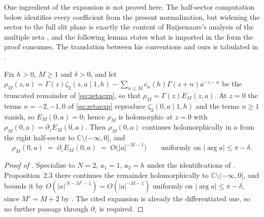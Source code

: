 \documentclass[11pt,letterpaper]{article}
\newcommand{\Zt}{\zeta_2}
\newcommand{\Cc}{\mathbb{C}}
\begin{document}
One ingredient of the expansion is not proved here. The half-sector computation
below identifies every coefficient from the present normalization, but widening
the sector to the full slit plane is exactly the content of Ruijsenaars's
analysis of the multiple zeta \cite{Ruij}, and the following lemma states what is
imported in the form the proof consumes. The translation between his conventions
and ours is tabulated in .

\begin{lemma}
\label{lem:sector}
Fix $h>0$, $M\ge1$ and $\delta>0$, and let
$\rho_M(z,a)=\Gamma(z)\Zt(z,a\mid1,h)-\sum_{n\le M}c_n(h)\Gamma(z+n)a^{-z-n}$ be
the truncated remainder of \eqref{eq:zetaexp}, so that $\rho_M=\Gamma(z)E_M(z,a)$.
At $z=0$ the terms $n=-2,-1,0$ of \eqref{eq:zetaexp} reproduce
$\Zt(0,a\mid1,h)$ and the terms $n\ge1$ vanish, so $E_M(0,a)=0$; hence $\rho_M$ is
holomorphic at $z=0$ with $\rho_M(0,a)=\partial_zE_M(0,a)$. Then $\rho_M(0,a)$
continues holomorphically in $a$ from the right half-sector to
$\Cc\setminus(-\infty,0]$, and
\begin{equation*}
  \rho_M(0,a)\;=\;\partial_zE_M(0,a)\;=\;O\bigl(\lvert a\rvert^{-M-1}\bigr)
  \qquad\text{uniformly on } \lvert\arg a\rvert\le\pi-\delta .
\end{equation*}
\end{lemma}

\begin{proof}[Proof of ]
Specialize \cite[Prop.~2.3 and (3.13)--(3.15)]{Ruij} to $N=2$, $a_1=1$, $a_2=h$
under the identifications of . Proposition~2.3 there continues the
remainder \cite[(3.14)]{Ruij} holomorphically to $\Cc\setminus(-\infty,0]$, and
\cite[(3.15)]{Ruij} bounds it by
$O(\lvert a\rvert^{\,N-M'-1})=O(\lvert a\rvert^{-M-1})$ uniformly on
$\lvert\arg a\rvert\le\pi-\delta$, since $M'=M+2$ by . The cited
expansion is already the differentiated one, so no further passage through
$\partial_z$ is required.
\end{proof}
\end{document}
